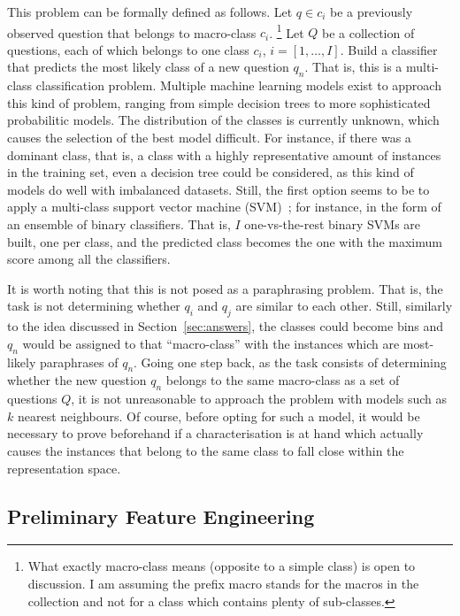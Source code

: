 \documentclass[11pt]{article}
\newcommand{\abc}[1]{\textcolor{magenta}{#1}}
\begin{document}
This problem can be formally defined as follows. Let $q\in c_i$ be a previously 
observed question that belongs to macro-class $c_i$.%
\footnote{What exactly macro-class means (opposite to a simple class) is open 
to discussion. I am assuming the prefix macro stands for the macros in the 
collection and not for a class which contains plenty of sub-classes.}
Let $Q$ be a collection of questions, each of which belongs to one class $c_i$, 
$i=[1,\ldots,I]$. Build a classifier that predicts the most likely class of a 
new question $q_n$. That is, this is a multi-class classification problem. 
Multiple machine learning models exist to approach this kind of problem, ranging 
from simple decision trees to more sophisticated probabilitic models. %
The distribution of the classes is currently unknown, which causes the selection 
of the best model difficult. For instance, if there was a dominant class, that 
is, a class with a highly representative amount of instances in the training 
set, even a decision tree could be considered, as this kind of models do well 
with imbalanced datasets. Still, the first option seems to be to apply a 
multi-class support vector machine (SVM)~\cite{Joachims:99}; for 
instance, in the form of an ensemble of binary classifiers. That is, $I$ 
one-vs-the-rest binary SVMs are built, one per class, and the predicted class 
becomes the one with the maximum score among all the classifiers. 

It is worth noting that this is not posed as a paraphrasing problem. That is, 
the task is not determining whether $q_i$ and $q_j$ are similar to each other. 
Still, similarly to the idea discussed in Section~\ref{sec:answers}, the 
classes could become bins and $q_n$ would be assigned to that ``macro-class'' 
with the instances which are most-likely paraphrases of $q_n$. Going 
one step back, as the task consists of determining whether the new 
question $q_n$ belongs to the same macro-class as a set of questions $Q$, it is 
not unreasonable to approach the problem with models such as $k$ nearest 
neighbours. Of course, before opting for such a model, it would be necessary to 
prove beforehand if a characterisation is at hand which actually causes the 
instances that belong to the same class to fall close within the representation 
space. 

\subsection{Preliminary Feature Engineering}
\end{document}
